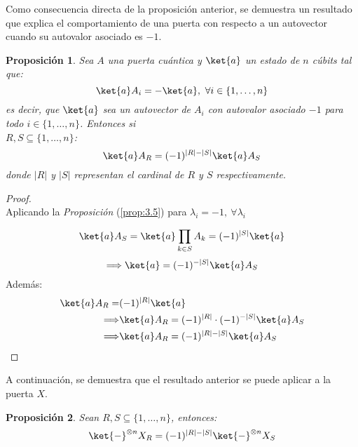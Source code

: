 \documentclass[10pt,conference,a4paper]{IEEEtran}
\newtheorem{prop}{Proposición}[section]
\providecommand{\abs}[1]{\lvert#1\rvert}
\begin{document}
    \vspace{1.5mm}
    Como consecuencia directa de la proposición anterior, se demuestra un resultado que explica el comportamiento de una puerta con respecto a un autovector cuando su autovalor asociado es $-1$.
    \vspace{1.5mm}
    \begin{prop}
        Sea $A$ una puerta cuántica y $\ket{a}$ un estado de $n$ cúbits tal que:
        $$\ket{a}A_i=-\ket{a},\ \forall i\in \{1,\ldots, n\}$$
        es decir, que $\ket{a}$ sea un autovector de $A_i$ con autovalor asociado $-1$ para todo $i\in \{1,\ldots, n\}$. Entonces si \\
        $R,S\subseteq\{1,\ldots, n\}$:
        \begin{equation}
            \ket{a}A_R=(-1)^{\abs{R}-\abs{S}}\ket{a}A_S
        \end{equation}
        \label{prop:4}
        donde $\abs{R}$ y $\abs{S}$ representan el cardinal de $R$ y $S$ respectivamente.
    \end{prop}
    \begin{proof}\\
    Aplicando la \textit{Proposición} (\ref{prop:3.5}) para $\lambda_i=-1,\ \forall \lambda_i$

    $$\ket{a}A_S=\ket{a}\displaystyle\prod_{k\in S}A_k=(-1)^{\abs{S}}\ket{a}$$
    $$\Longrightarrow \ket{a}=(-1)^{-\abs{S}}\ket{a}A_S$$
    Además:
    \begin{align*}
        \ket{a}A_R =& (-1)^{\abs{R}}\ket{a}\\
        \Longrightarrow&\ket{a}A_R=(-1)^{\abs{R}}\cdot(-1)^{-\abs{S}}\ket{a}A_S\\
        \Longrightarrow &\ket{a}A_R=(-1)^{\abs{R}-\abs{S}}\ket{a}A_S
    \end{align*}
    \end{proof}
    \vspace{1.5mm}
    A continuación, se demuestra que el resultado anterior se puede aplicar a la puerta $X$.
    \vspace{1.5mm}
    \begin{prop}
        Sean $R, S\subseteq \{1,\ldots, n\}$, entonces:
        \begin{equation}
            \ket{-}^{\otimes n} X_R=(-1)^{\abs{R}-\abs{S}}\ket{-}^{\otimes n}X_S
        \end{equation}
        \label{prop:5}
    \end{prop}
\end{document}
